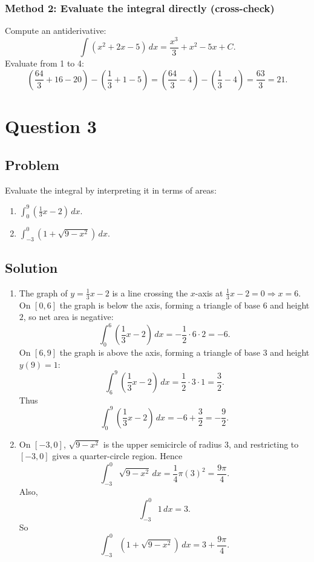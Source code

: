 \documentclass[12pt]{article}
\begin{document}
\subsubsection*{Method 2: Evaluate the integral directly (cross-check)}

Compute an antiderivative:
\[
\int (x^2+2x-5)\,dx = \frac{x^3}{3}+x^2-5x + C.
\]
Evaluate from 1 to 4:
\[
\left(\frac{64}{3}+16-20\right) - \left(\frac{1}{3}+1-5\right)
=\left(\frac{64}{3}-4\right)-\left(\frac{1}{3}-4\right)
=\frac{63}{3}
=21.
\]


\bigskip


\newpage

\section*{Question 3}

\subsection*{Problem}

Evaluate the integral by interpreting it in terms of areas:
\begin{enumerate}[label=(\roman*)]
\item \(\displaystyle \int_0^9 \left(\frac{1}{3}x - 2\right)\,dx.\)
\item \(\displaystyle \int_{-3}^{0}\left(1+\sqrt{9-x^2}\right)\,dx.\)
\end{enumerate}

\subsection*{Solution}
\begin{enumerate}[label=(\roman*)]
\item The graph of \(y=\frac{1}{3}x-2\) is a line crossing the \(x\)-axis at \(\frac{1}{3}x-2=0\Rightarrow x=6\).
On \([0,6]\) the graph is below the axis, forming a triangle of base \(6\) and height \(2\), so net area is negative:
\[
\int_0^6\left(\frac{1}{3}x-2\right)\,dx = -\frac{1}{2}\cdot 6\cdot 2 = -6.
\]
On \([6,9]\) the graph is above the axis, forming a triangle of base \(3\) and height \(y(9)=1\):
\[
\int_6^9\left(\frac{1}{3}x-2\right)\,dx = \frac{1}{2}\cdot 3\cdot 1 = \frac{3}{2}.
\]
Thus
\[
\int_0^9\left(\frac{1}{3}x-2\right)\,dx = -6+\frac{3}{2}=-\frac{9}{2}.
\]

\item On \([-3,0]\), \(\sqrt{9-x^2}\) is the upper semicircle of radius \(3\), and restricting to \([-3,0]\) gives a quarter-circle region. Hence
\[
\int_{-3}^0 \sqrt{9-x^2}\,dx = \frac{1}{4}\pi (3)^2 = \frac{9\pi}{4}.
\]
Also,
\[
\int_{-3}^0 1\,dx = 3.
\]
So
\[
\int_{-3}^{0}\left(1+\sqrt{9-x^2}\right)\,dx = 3+\frac{9\pi}{4}.
\]
\end{enumerate}
\end{document}
